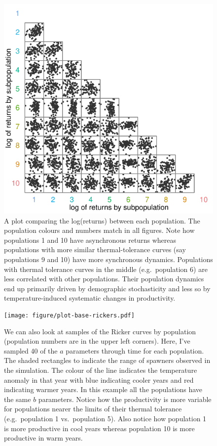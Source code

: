 \documentclass[12pt]{article}
\begin{document}
\begin{figure}[htbp]
\centering
\includegraphics{figure/plot-base-corrs.pdf}
\caption{A plot comparing the log(returns) between each population. The
population colours and numbers match in all figures. Note how
populations 1 and 10 have asynchronous returns whereas populations with
more similar thermal-tolerance curves (say populations 9 and 10) have
more synchronous dynamics. Populations with thermal tolerance curves in
the middle (e.g.~population 6) are less correlated with other
populations. Their population dynamics end up primarily driven by
demographic stochasticity and less so by temperature-induced systematic
changes in productivity.}
\end{figure}

\begin{figure}[htbp]
\centering
\texttt{[image: figure/plot-base-rickers.pdf]}
\caption{We can also look at samples of the Ricker curves by population
(population numbers are in the upper left corners). Here, I've sampled
40 of the $a$ parameters through time for each population. The shaded
rectangles to indicate the range of spawners observed in the simulation.
The colour of the line indicates the temperature anomaly in that year
with blue indicating cooler years and red indicating warmer years. In
this example all the populations have the same $b$ parameters. Notice
how the productivity is more variable for populations nearer the limits
of their thermal tolerance (e.g.~population 1 vs.~population 5). Also
notice how population 1 is more productive in cool years whereas
population 10 is more productive in warm years.}
\end{figure}
\end{document}
